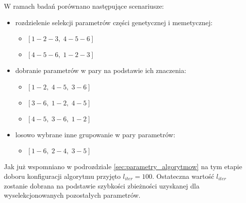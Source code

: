 \par
W ramach badań porównano następujące scenariusze:
\begin{itemize}
\item rozdzielenie selekcji parametrów części genetycznej i memetycznej:
\begin{itemize}
\item $[1-2-3,\; 4-5-6]$
\item $[4-5-6,\; 1-2-3]$
\end{itemize}
\item dobranie parametrów w pary na podstawie ich znaczenia:
\begin{itemize}
\item $[1-2,\; 4-5,\; 3-6]$
\item $[3-6,\; 1-2,\; 4-5]$
\item $[4-5,\; 3-6,\; 1-2]$
\end{itemize}
\item losowo wybrane inne grupowanie w pary parametrów:
\begin{itemize}
\item $[1-6,\; 2-4,\; 3-5]$
\end{itemize}
\end{itemize}
Jak już wspomniano w podrozdziale \ref{sec:parametry_algorytmow} na tym etapie doboru konfiguracji algorytmu przyjęto $l_{iter}=100$. Ostateczna wartość $l_{iter}$ zostanie dobrana na podstawie szybkości zbieżności uzyskanej dla wyselekcjonowanych pozostałych parametrów.

